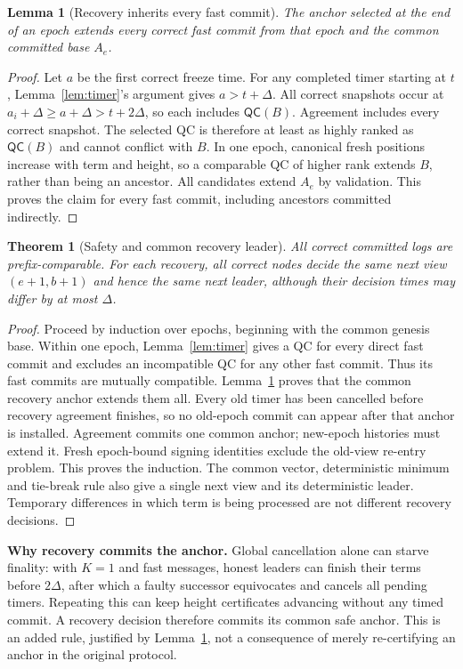 \documentclass[10pt,a4paper]{article}
\newcommand{\QC}{\mathsf{QC}}
\newtheorem{lemma}{Lemma}
\newtheorem{theorem}{Theorem}
\begin{document}
\begin{lemma}[Recovery inherits every fast commit]\label{lem:inherit}
The anchor selected at the end of an epoch extends every correct fast
commit from that epoch and the common committed base $A_e$.
\end{lemma}
\begin{proof}
Let $a$ be the first correct freeze time. For any completed timer starting
at $t$, Lemma~\ref{lem:timer}'s argument gives $a>t+\Delta$. All correct
snapshots occur at $a_i+\Delta\ge a+\Delta>t+2\Delta$, so each includes
$\QC(B)$. Agreement includes every correct snapshot. The selected QC is
therefore at least as highly ranked as $\QC(B)$ and cannot conflict with
$B$. In one epoch, canonical fresh positions increase with term and height,
so a comparable QC of higher rank extends $B$, rather than being an ancestor.
All candidates extend $A_e$ by validation. This proves the claim for every
fast commit, including ancestors committed indirectly.
\end{proof}

\begin{theorem}[Safety and common recovery leader]
All correct committed logs are prefix-comparable. For each recovery,
all correct nodes decide the same next view $(e+1,b+1)$ and hence the same
next leader, although their decision times may differ by at most $\Delta$.
\end{theorem}
\begin{proof}
Proceed by induction over epochs, beginning with the common genesis base.
Within one epoch, Lemma~\ref{lem:timer} gives a QC for every direct fast
commit and excludes an incompatible QC for any other fast commit. Thus its
fast commits are mutually compatible. Lemma~\ref{lem:inherit} proves that
the common recovery anchor extends them all. Every old timer has been
cancelled before recovery agreement finishes, so no old-epoch commit can
appear after that anchor is installed. Agreement commits one common anchor;
new-epoch histories must extend it. Fresh epoch-bound signing identities
exclude the old-view re-entry problem. This proves the induction.
The common vector, deterministic minimum and tie-break rule also give a
single next view and its deterministic leader. Temporary differences in
which term is being processed are not different recovery decisions.
\end{proof}

\textbf{Why recovery commits the anchor.} Global cancellation alone can
starve finality: with $K=1$ and fast messages, honest leaders can finish their
terms before $2\Delta$, after which a faulty successor equivocates and cancels
all pending timers. Repeating this can keep height certificates advancing
without any timed commit. A recovery decision therefore commits its common
safe anchor. This is an added rule, justified by Lemma~\ref{lem:inherit}, not
a consequence of merely re-certifying an anchor in the original protocol.
\end{document}
